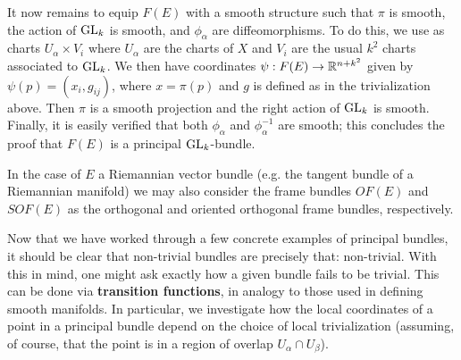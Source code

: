 \begin{exmp}
    It now remains to equip $F(E)$ with a smooth structure such that $\pi$ is smooth, the action of $\operatorname{GL}_k$ is smooth, and $\phi_\alpha$ are
    diffeomorphisms. To do this, we use as charts $U_\alpha\times V_i$ where $U_\alpha$ are the charts of $X$ and $V_i$ are the usual $k^2$
    charts associated to $\operatorname{GL}_k$. We then have coordinates $\psi:F(E)\to\mathbb{R}^{n+k^2}$ given by $\psi(p)=(x_i,g_{ij})$, where $x=\pi(p)$ and $g$
    is defined as in the trivialization above. Then $\pi$ is a smooth projection and the right action of $\operatorname{GL}_k$ is smooth. Finally, it is easily
    verified that both $\phi_\alpha$ and $\phi_\alpha^{-1}$ are smooth; this concludes the proof that $F(E)$ is a principal $\operatorname{GL}_k$-bundle.
    

\end{exmp}

\begin{rmk}
    In the
    case of $E$ a Riemannian vector bundle (e.g. the tangent bundle of a Riemannian manifold) we may also consider the frame bundles
    $OF(E)$ and $SOF(E)$ as the orthogonal and oriented orthogonal frame bundles, respectively.
\end{rmk}

Now that we have worked through a few concrete examples of principal bundles, it should be clear that non-trivial bundles are precisely that: non-trivial.
With this in mind, one might ask exactly how a
given bundle fails to be trivial. This can be done via \textbf{transition functions}, in analogy to those used in defining smooth manifolds.
In particular, we investigate how the local coordinates of a point in a principal bundle depend on the choice of local trivialization (assuming, of
course, that the point is in a region of overlap $U_\alpha\cap U_\beta$).


